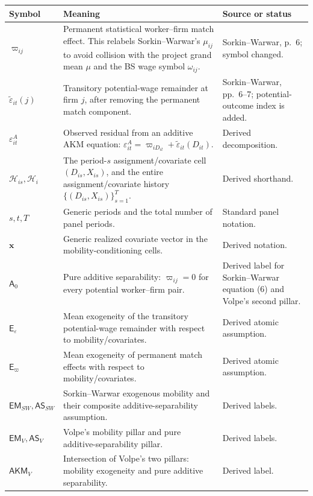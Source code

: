 \documentclass[11pt]{article}
\begin{document}
\begin{longtable}{p{}p{}p{}}
\textbf{Symbol} & \textbf{Meaning} & \textbf{Source or status} \\
\hline
\(\varpi_{ij}\) & Permanent statistical worker--firm match effect.  This
relabels Sorkin--Warwar's \(\mu_{ij}\) to avoid collision with the project
grand mean \(\mu\) and the BS wage symbol \(\omega_{ij}\). &
Sorkin--Warwar, p.\ 6; symbol changed. \\
\(\widetilde\varepsilon_{it}(j)\) & Transitory potential-wage remainder at
firm \(j\), after removing the permanent match component. & Sorkin--Warwar,
pp.\ 6--7; potential-outcome index is added. \\
\(\varepsilon^A_{it}\) & Observed residual from an additive AKM equation:
\(\varepsilon^A_{it}=\varpi_{iD_{it}}+
\widetilde\varepsilon_{it}(D_{it})\). & Derived decomposition. \\
\(\mathcal H_{is},\mathcal H_i\) & The period-\(s\) assignment/covariate cell
\((D_{is},X_{is})\), and the entire assignment/covariate history
\(\{(D_{is},X_{is})\}_{s=1}^T\). & Derived shorthand. \\
\(s,t,T\) & Generic periods and the total number of panel periods. & Standard
panel notation. \\
\(\mathbf x\) & Generic realized covariate vector in the
mobility-conditioning cells. & Derived notation. \\
\(\mathsf A_0\) & Pure additive separability:
\(\varpi_{ij}=0\) for every potential worker--firm pair. & Derived label for
Sorkin--Warwar equation (6) and Volpe's second pillar. \\
\(\mathsf E_\varepsilon\) & Mean exogeneity of the transitory potential-wage
remainder with respect to mobility/covariates. & Derived atomic assumption. \\
\(\mathsf E_\varpi\) & Mean exogeneity of permanent match effects with
respect to mobility/covariates. & Derived atomic assumption. \\
\(\mathsf{EM}_{SW},\mathsf{AS}_{SW}\) & Sorkin--Warwar exogenous mobility and
their composite additive-separability assumption. & Derived labels. \\
\(\mathsf{EM}_{V},\mathsf{AS}_{V}\) & Volpe's mobility pillar and pure
additive-separability pillar. & Derived labels. \\
\(\mathsf{AKM}_{V}\) & Intersection of Volpe's two pillars: mobility
exogeneity and pure additive separability. & Derived label. \\

\end{longtable}
\end{document}
